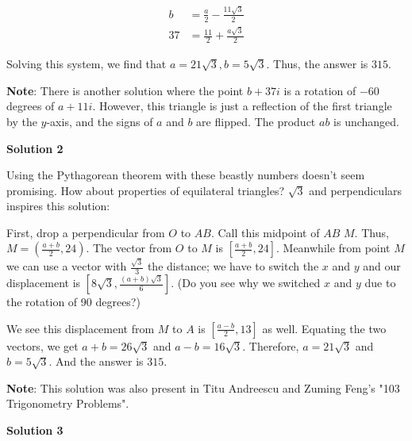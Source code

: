 \begin{enumerate}
 
 \begin{align*}b&=\frac{a}{2}-\frac{11\sqrt{3}}{2}\\37&=\frac{11}{2}+\frac{a\sqrt{3}}{2} \end{align*}


 Solving this system, we find that $a=21\sqrt{3}, b=5\sqrt{3}$. Thus, the answer is $\boxed{315}$.

 \textbf{Note}: There is another solution where the point $b+37i$ is a rotation of $-60$ degrees of $a+11i$. However, this triangle is just a reflection of the first triangle by the $y$-axis, and the signs of $a$ and $b$ are flipped. The product $ab$ is unchanged.

 



\textbf{Solution 2}

Using the Pythagorean theorem with these beastly numbers doesn't seem promising. How about properties of equilateral triangles? $\sqrt{3}$ and perpendiculars inspires this solution:

 First, drop a perpendicular from $O$ to $AB$. Call this midpoint of $AB$ $M$. Thus, $M=\left(\frac{a+b}{2}, 24\right)$. The vector from $O$ to $M$ is $\left[\frac{a+b}{2}, 24\right]$. Meanwhile from point $M$ we can use a vector with $\frac{\sqrt{3}}{3}$ the distance; we have to switch the $x$ and $y$ and our displacement is $\left[8\sqrt{3}, \frac{(a+b)\sqrt{3}}{6}\right]$. (Do you see why we switched $x$ and $y$ due to the rotation of 90 degrees?)

 
We see this displacement from $M$ to $A$ is $\left[\frac{a-b}{2}, 13\right]$ as well. Equating the two vectors, we get $a+b=26\sqrt{3}$ and $a-b=16\sqrt{3}$. Therefore, $a=21\sqrt{3}$ and $b=5\sqrt{3}$. And the answer is $\boxed{315}$.

 \textbf{Note}: This solution was also present in Titu Andreescu and Zuming Feng's "103 Trigonometry Problems".

 



\textbf{Solution 3}


\end{enumerate}
